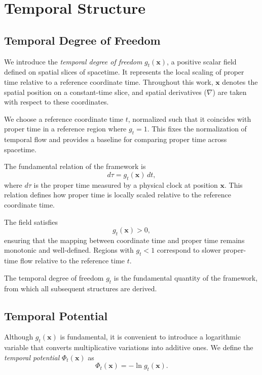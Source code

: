\documentclass[12pt]{article}
\begin{document}
\section{Temporal Structure}
\label{sec:temporal_structure}

\subsection{Temporal Degree of Freedom}
\label{sec:g_t}

We introduce the \emph{temporal degree of freedom} $g_t(\mathbf{x})$, a positive scalar field defined on spatial slices of spacetime. It represents the local scaling of proper time relative to a reference coordinate time. Throughout this work, $\mathbf{x}$ denotes the spatial position on a constant-time slice, and spatial derivatives ($\nabla$) are taken with respect to these coordinates.

We choose a reference coordinate time $t$, normalized such that it coincides with proper time in a reference region where $g_t = 1$. This fixes the normalization of temporal flow and provides a baseline for comparing proper time across spacetime.

The fundamental relation of the framework is
\begin{equation}
d\tau = g_t(\mathbf{x})\, dt ,
\label{eq:proper_time}
\end{equation}
where $d\tau$ is the proper time measured by a physical clock at position $\mathbf{x}$. This relation defines how proper time is locally scaled relative to the reference coordinate time.

The field satisfies
$$
g_t(\mathbf{x}) > 0 ,
$$
ensuring that the mapping between coordinate time and proper time remains monotonic and well-defined. Regions with $g_t < 1$ correspond to slower proper-time flow relative to the reference time $t$.

The temporal degree of freedom $g_t$ is the fundamental quantity of the framework, from which all subsequent structures are derived.

\subsection{Temporal Potential}
\label{sec:Phi_t}

Although $g_t(\mathbf{x})$ is fundamental, it is convenient to introduce a logarithmic variable that converts multiplicative variations into additive ones. We define the \emph{temporal potential} $\Phi_t(\mathbf{x})$ as
\begin{equation}
\Phi_t(\mathbf{x}) = - \ln g_t(\mathbf{x}) .
\label{eq:temporal_potential}
\end{equation}
\end{document}
